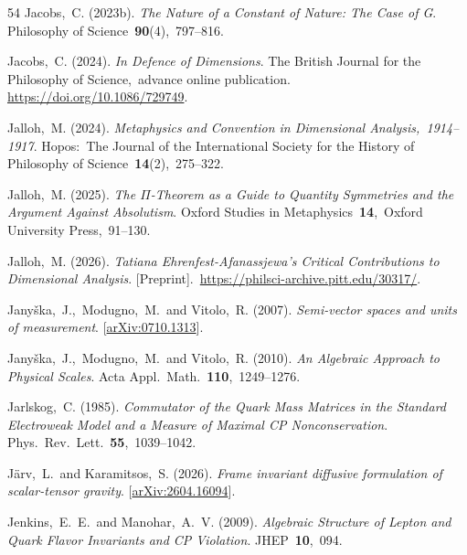 \documentclass[12pt]{article}
\numberwithin{equation}{section}
\begin{document}
\begin{small}
\begin{thebibliography}{54}
{Jacobs,~C.} (2023b).
{\em The Nature of a Constant of Nature: The Case of G}.
Philosophy of Science~\textbf{90}(4),~797--816.

{Jacobs,~C.} (2024).
{\em In Defence of Dimensions}.
The British Journal for the Philosophy of Science,~advance online publication.
\href{https://doi.org/10.1086/729749}{https://doi.org/10.1086/729749}.

{Jalloh,~M.} (2024).
{\em Metaphysics and Convention in Dimensional Analysis,~1914--1917}.
Hopos:~The Journal of the International Society for the History of Philosophy of Science~\textbf{14}(2),~275--322.

{Jalloh,~M.} (2025).
{\em The \ensuremath{\Pi}-Theorem as a Guide to Quantity Symmetries and the Argument Against Absolutism}.
Oxford Studies in Metaphysics~\textbf{14},~Oxford University Press,~91--130.

{Jalloh,~M.} (2026).
{\em Tatiana Ehrenfest-Afanassjewa's Critical Contributions to Dimensional Analysis}.
[Preprint].~\href{https://philsci-archive.pitt.edu/30317/}{https://philsci-archive.pitt.edu/30317/}.

{Jany\v{s}ka,~J.,~Modugno,~M.~and Vitolo,~R.} (2007).
{\em Semi-vector spaces and units of measurement}.
[\href{https://arxiv.org/abs/0710.1313}{arXiv:0710.1313}].

{Jany\v{s}ka,~J.,~Modugno,~M.~and Vitolo,~R.} (2010).
{\em An Algebraic Approach to Physical Scales}.
Acta Appl.~Math.~\textbf{110},~1249--1276.

{Jarlskog,~C.} (1985).
{\em Commutator of the Quark Mass Matrices in the Standard Electroweak Model and a Measure of Maximal CP Nonconservation}.
Phys.~Rev.~Lett.~\textbf{55},~1039--1042.

{J\"arv,~L.~and Karamitsos,~S.} (2026).
{\em Frame invariant diffusive formulation of scalar-tensor gravity}.
[\href{https://arxiv.org/abs/2604.16094}{arXiv:2604.16094}].

{Jenkins,~E.~E.~and Manohar,~A.~V.} (2009).
{\em Algebraic Structure of Lepton and Quark Flavor Invariants and CP Violation}.
JHEP~\textbf{10},~094.


\end{thebibliography}
\end{small}
\end{document}
